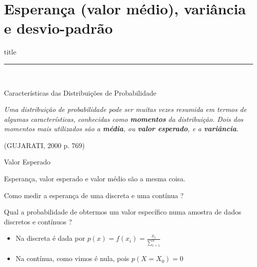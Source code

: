 \documentclass{beamer}
\begin{document}
\section{Esperança (valor médio), variância e desvio-padrão}
    \begin{frame}[plain]
        \vfill
      \centering
      \begin{beamercolorbox}[sep=8pt,center,shadow=true,rounded=true]{title}
        \insertsectionhead\par%
        \color{oxfordblue}\noindent\rule{10cm}{1pt} \\
        \LARGE{\faFileCodeO}
      \end{beamercolorbox}
      \vfill
  \end{frame}
\begin{frame}{Características das Distribuições de Probabilidade}


\textit{Uma distribuição de probabilidade pode ser muitas vezes resumida em termos de algumas características, conhecidas como \textbf{momentos} da distribuição. Dois dos momentos mais utilizados são a \textbf{média}, ou \textbf{valor esperado}, e a \textbf{variância}.}

(GUJARATI, 2000 p. 769)~\cite{gujarati}

\end{frame}





\begin{frame}{Valor Esperado}

Esperança, valor esperado e valor médio são a mesma coisa.

Como medir a esperança de uma discreta e uma contínua ?

Qual a probabilidade de obtermos um valor específico numa amostra de dados discretos e contínuos ?

\begin{itemize}
    \item Na discreta é dada por $p(x)=f(x_{i})=\displaystyle\frac{x_{i}}{\sum_{i=1}^{n}}$
    \item Na contínua, como vimos é nula, pois $p(X=X_{0})=0$
\end{itemize}


\end{frame}
\end{document}
